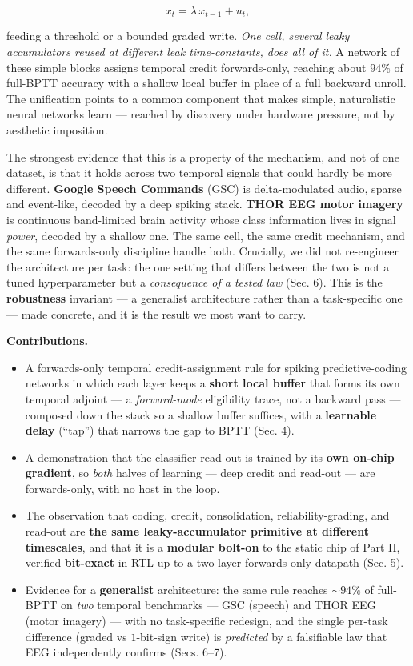 \documentclass[11pt]{article}
\providecommand{\tightlist}{\setlength{\itemsep}{0pt}\setlength{\parskip}{0pt}}
\begin{document}
\[x_t = \lambda\, x_{t-1} + u_t,\]

feeding a threshold or a bounded graded write. \emph{One cell, several
leaky accumulators reused at different leak time-constants, does all of
it.} A network of these simple blocks assigns temporal credit
forwards-only, reaching about \(94\%\) of full-BPTT accuracy with a
shallow local buffer in place of a full backward unroll. The unification
points to a common component that makes simple, naturalistic neural
networks learn --- reached by discovery under hardware pressure, not by
aesthetic imposition.

The strongest evidence that this is a property of the mechanism, and not
of one dataset, is that it holds across two temporal signals that could
hardly be more different. \textbf{Google Speech Commands} (GSC) is
delta-modulated audio, sparse and event-like, decoded by a deep spiking
stack. \textbf{THOR EEG motor imagery} is continuous band-limited brain
activity whose class information lives in signal \emph{power}, decoded
by a shallow one. The same cell, the same credit mechanism, and the same
forwards-only discipline handle both. Crucially, we did not re-engineer
the architecture per task: the one setting that differs between the two
is not a tuned hyperparameter but a \emph{consequence of a tested law}
(Sec. 6). This is the \textbf{robustness} invariant --- a generalist
architecture rather than a task-specific one --- made concrete, and it
is the result we most want to carry.

\textbf{Contributions.}

\begin{itemize}
\tightlist
\item
  A forwards-only temporal credit-assignment rule for spiking
  predictive-coding networks in which each layer keeps a \textbf{short
  local buffer} that forms its own temporal adjoint --- a
  \emph{forward-mode} eligibility trace, not a backward pass ---
  composed down the stack so a shallow buffer suffices, with a
  \textbf{learnable delay} (``tap'') that narrows the gap to BPTT (Sec.
  4).
\item
  A demonstration that the classifier read-out is trained by its
  \textbf{own on-chip gradient}, so \emph{both} halves of learning ---
  deep credit and read-out --- are forwards-only, with no host in the
  loop.
\item
  The observation that coding, credit, consolidation,
  reliability-grading, and read-out are \textbf{the same
  leaky-accumulator primitive at different timescales}, and that it is a
  \textbf{modular bolt-on} to the static chip of Part II, verified
  \textbf{bit-exact} in RTL up to a two-layer forwards-only datapath
  (Sec. 5).
\item
  Evidence for a \textbf{generalist} architecture: the same rule reaches
  \({\sim}94\%\) of full-BPTT on \emph{two} temporal benchmarks --- GSC
  (speech) and THOR EEG (motor imagery) --- with no task-specific
  redesign, and the single per-task difference (graded vs \(1\)-bit-sign
  write) is \emph{predicted} by a falsifiable law that EEG independently
  confirms (Secs. 6--7).
\end{itemize}
\end{document}

